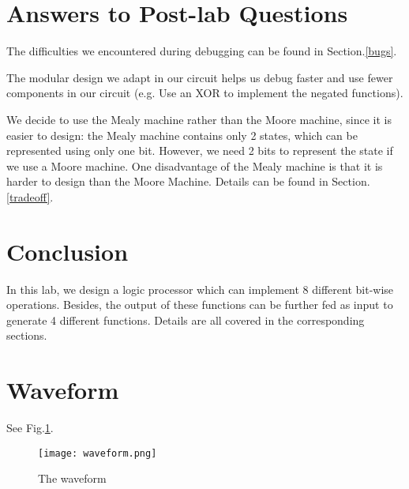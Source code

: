 \documentclass[12pt]{article}
\begin{document}
\section{Answers to Post-lab Questions}
The difficulties we encountered during debugging can be found in Section.\ref{bugs}.

The modular design we adapt in our circuit helps us debug faster and use fewer components in our circuit (e.g. Use an XOR to implement the negated functions).

We decide to use the Mealy machine rather than the Moore machine, since it is easier to design: the Mealy machine contains only 2 states, which can be represented using only one bit. However, we need 2 bits to represent the state if we use a Moore machine. One disadvantage of the Mealy machine is that it is harder to design than the Moore Machine. Details can be found in Section.\ref{tradeoff}.

\section{Conclusion}
In this lab, we design a logic processor which can implement 8 different bit-wise operations. Besides, the output of these functions can be further fed as input to generate 4 different functions. Details are all covered in the corresponding sections.

\section{Waveform}
See Fig.\ref{waveform}.
\begin{figure}[h]
    \centering
    \texttt{[image: waveform.png]}
    \caption{The waveform}
    \label{waveform}
\end{figure}
\end{document}
